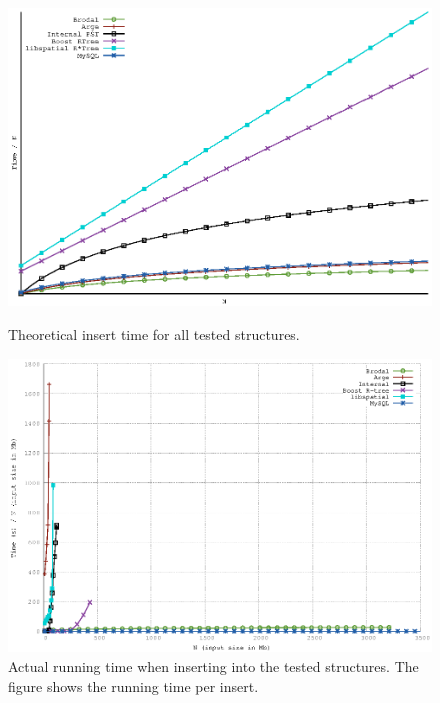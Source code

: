 \documentclass[twoside,11pt,openright]{report}
\begin{document}
\begin{figure}[htp!]
\includegraphics[width=\textwidth]{../plots/insert_complexities/insert_complexity}
\caption{Theoretical insert time for all tested structures.}
\label{fig:theory_insert_complexity}

\includegraphics[width=\textwidth]{../src/experiments/insert_experiment_results/2016-05-06.14_11_08/time}
\caption{Actual running time when inserting into the tested structures. The figure shows the running time per insert.}
\label{fig:actual_insert_time}
\end{figure}
\end{document}
